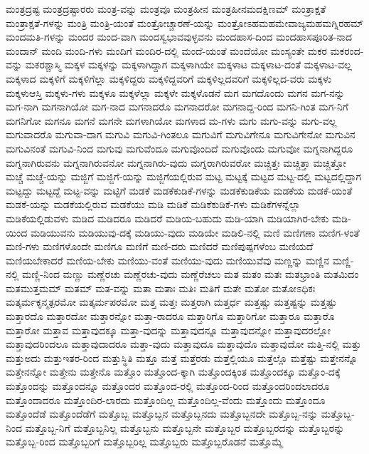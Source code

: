 {ಮಂತ್ರದ್ರಷ್ಟ
ಮಂತ್ರದ್ರಷ್ಟಾರರು
ಮಂತ್ರ-ವನ್ನು
ಮಂತ್ರವೂ
ಮಂತ್ರಹೀನ
ಮಂತ್ರಹೀನಮದಕ್ಷಿಣಮ್
ಮಂತ್ರಾಕ್ಷತೆ
ಮಂತ್ರಾಕ್ಷತೆ-ಗಳನ್ನು
ಮಂತ್ರಿ
ಮಂತ್ರಿ-ಯಂತೆ
ಮಂತ್ರೋಚ್ಚಾರಣೆ-ಯನ್ನು
ಮಂತ್ರೋಽಹಮಹಮೇವಾಜ್ಯಮಹಮಗ್ನಿರಹಮ್
ಮಂದಮತಿ-ಗಳನ್ನು
ಮಂದರ
ಮಂದ-ವಾಗಿ
ಮಂದಸ್ವಭಾವವುಳ್ಳವನು
ಮಂದಹಾಸ-ದಿಂದ
ಮಂದಹಾಸಪೂರಿತ-ನಾದ
ಮಂದಾನ್
ಮಂದಿ
ಮಂದಿ-ಗಳು
ಮಂದಿಗೆ
ಮಂದಿರ-ದಲ್ಲಿ
ಮಂದೆ-ಯಂತೆ
ಮಂದೆಯೋ
ಮಂಸ್ಯಂತೇ
ಮಕರ
ಮಕರಂದ-ವನ್ನು
ಮಕರಶ್ಚಾಸ್ಮಿ
ಮಕ್ಕಳ
ಮಕ್ಕಳನ್ನು
ಮಕ್ಕಳಾಗಿದ್ದಾಗ
ಮಕ್ಕಳಾಗಿಯೇ
ಮಕ್ಕಳಾಟ
ಮಕ್ಕಳಾಟ-ದಂತೆ
ಮಕ್ಕಳಾಟ-ವಲ್ಲ
ಮಕ್ಕಳಾದ
ಮಕ್ಕಳಿಗೆ
ಮಕ್ಕಳಿಗೆಲ್ಲಾ
ಮಕ್ಕಳಿದ್ದರು
ಮಕ್ಕಳಿದ್ದವರಿಗೆ
ಮಕ್ಕಳಿಲ್ಲದವರಿಗೆ
ಮಕ್ಕಳಿಲ್ಲದ-ವರು
ಮಕ್ಕಳು
ಮಕ್ಕಳುಆಸ್ತಿ
ಮಕ್ಕಳು-ಗಳು
ಮಕ್ಕಳೂ
ಮಕ್ಕಳೆಲ್ಲಾ
ಮಕ್ಕಳೇ
ಮಕ್ಕಳೊಡನೆ
ಮಗ
ಮಗದೊಂದು
ಮಗನ
ಮಗ-ನನ್ನು
ಮಗ-ನಾಗಿ
ಮಗನಾಗಿಯೋ
ಮಗ-ನಾದ
ಮಗನಾದರೊ
ಮಗನಾದರೋ
ಮಗನಾದ್ದ-ರಿಂದ
ಮಗನಿ-ಗಿಂತ
ಮಗ-ನಿಗೆ
ಮಗನಿಗೋ
ಮಗನೂ
ಮಗನೆ
ಮಗನೇ
ಮಗಳಾಗಿಯೋ
ಮಗಳಾದ
ಮ-ಗಳು
ಮಗು
ಮಗು-ವನ್ನು
ಮಗು-ವಲ್ಲ
ಮಗುವಾದರೊ
ಮಗುವಾ-ದಾಗ
ಮಗುವಿ
ಮಗುವಿ-ಗಿಂತಲೂ
ಮಗುವಿಗೆ
ಮಗುವಿಗೇನೂ
ಮಗುವಿಗೇನೋ
ಮಗುವಿನ
ಮಗುವಿನಂತೆ
ಮಗುವಿ-ನಿಂದ
ಮಗುವು
ಮಗುವೆಂದೂ
ಮಗುವೊಂದಿದೆ
ಮಗುವೊಂದು
ಮಗುವೋ
ಮಗ್ನನಾಗಿದ್ದರೂ
ಮಗ್ನನಾಗಿರುವನು
ಮಗ್ನನಾಗಿರುವನೋ
ಮಗ್ನನಾಗಿರು-ವುದು
ಮಗ್ನರಾಗಿರುವರೋ
ಮಚ್ಚಿತ್ತಃ
ಮಚ್ಚಿತ್ತಾ
ಮಚ್ಚಿತ್ತೋ
ಮಚ್ಚೆ
ಮಚ್ಚೆ-ಯನ್ನು
ಮಜ್ಜಿಗೆ
ಮಜ್ಜಿಗೆ-ಯನ್ನು
ಮಜ್ಜಿಗೆಯಲ್ಲಿರುವ
ಮಟ್ಟ
ಮಟ್ಟಕ್ಕೆ
ಮಟ್ಟದ
ಮಟ್ಟ-ದಲ್ಲಿ
ಮಟ್ಟದಲ್ಲಿದ್ದಾಗ
ಮಟ್ಟದ್ದು
ಮಟ್ಟದ್ದೆ
ಮಟ್ಟ-ವನ್ನು
ಮಟ್ಟಿಗೆ
ಮಡಕೆ
ಮಡಕೆಕುಡಿಕೆ-ಗಳನ್ನು
ಮಡಕೆಕುಡಿಕೆಯ
ಮಡಕೆಯ
ಮಡಕೆ-ಯಂತೆ
ಮಡಕೆ-ಯನ್ನು
ಮಡಕೆಯಲ್ಲಿರುವ
ಮಡಕೆಯು
ಮಡಿ
ಮಡಿಕೆ
ಮಡಿಕೆಕುಡಿಕೆ-ಗಳು
ಮಡಿಕೆಗಳನ್ನೆಲ್ಲಾ
ಮಡಿಕೆಯಲ್ಲಿಡುವಳು
ಮಡಿದ
ಮಡಿದರೂ
ಮಡಿದರೆ
ಮಡಿಯ-ಬಹುದು
ಮಡಿ-ಯಾಗಿ
ಮಡಿಯಾಗಿರ-ಬೇಕು
ಮಡಿ-ಯಿಂದ
ಮಡಿಯುವನು
ಮಡಿಯುವು-ದಕ್ಕೆ
ಮಡಿಯು-ವುದು
ಮಡಿಯೇ
ಮಡಿಲಿ-ನಲ್ಲಿ
ಮಣಿ
ಮಣಿಗಣಾ
ಮಣಿಗ-ಳಂತೆ
ಮಣಿ-ಗಳು
ಮಣಿಗಳೊಂದೇ
ಮಣಿಗೂ
ಮಣಿಗೆ
ಮಣಿ-ದರು
ಮಣಿದರೆ
ಮಣಿಪುಷ್ಪಗಳೆಂಬ
ಮಣಿಯದೆ
ಮಣಿಯಬೇಕಾದರೆ
ಮಣಿಯ-ಬೇಕು
ಮಣಿಯು-ವಂತೆ
ಮಣಿಯು-ವುದು
ಮಣಿಯುವೆವು
ಮಣ್ಣನ್ನು
ಮಣ್ಣಿನ
ಮಣ್ಣಿ-ನಲ್ಲಿ
ಮಣ್ಣಿ-ನಿಂದ
ಮಣ್ಣು
ಮಣ್ಣೆರಚು
ಮಣ್ಣೆರಚು-ವುದು
ಮಣ್ಣೆರೆಚಲು
ಮತ
ಮತಂ
ಮತಃ
ಮತಭ್ರಾಂತಿ
ಮತಮಿದಂ
ಮತಮುತ್ತಮಮ್
ಮತಮ್
ಮತ-ವನ್ನು
ಮತಾ
ಮತಾಃ
ಮತಿಃ
ಮತಿಗೆ
ಮತೇ
ಮತೋ
ಮತೋಽಧಿಕಃ
ಮತ್ಕರ್ಮಕೃನ್ಮತ್ಪರಮೋ
ಮತ್ಕರ್ಮಪರಮೋ
ಮತ್ತ
ಮತ್ತಃ
ಮತ್ತರಾಗಿ
ಮತ್ತರ್ಧ
ಮತ್ತಷ್ಚು
ಮತ್ತಷ್ಟನ್ನು
ಮತ್ತಷ್ಟು
ಮತ್ತಾರದೊ
ಮತ್ತಾರದೋ
ಮತ್ತಾರನ್ನೋ
ಮತ್ತಾ-ರಾದರೂ
ಮತ್ತಾರಿಗೊ
ಮತ್ತಾರಿಗೋ
ಮತ್ತಾರೂ
ಮತ್ತಾರೊ
ಮತ್ತಾರೋ
ಮತ್ತಾವ
ಮತ್ತಾವುದಕ್ಕೂ
ಮತ್ತಾ-ವುದನ್ನು
ಮತ್ತಾವುದನ್ನೂ
ಮತ್ತಾವುದನ್ನೋ
ಮತ್ತಾವುದರಲ್ಲೋ
ಮತ್ತಾವುದರಿಂದಲೂ
ಮತ್ತಾವುದಾದರೂ
ಮತ್ತಾ-ವುದು
ಮತ್ತಾವುದೂ
ಮತ್ತಾವುದೊ
ಮತ್ತಾವುದೋ
ಮತ್ತಿ-ನಲ್ಲಿ
ಮತ್ತು
ಮತ್ತುಅದು
ಮತ್ತುಇತರ-ರಿಂದ
ಮತ್ತುಸ್ಥಿತಿ
ಮತ್ತೂ
ಮತ್ತೆ
ಮತ್ತೆರಡು
ಮತ್ತೆಲ್ಲಿಯೂ
ಮತ್ತೆಲ್ಲೊ
ಮತ್ತೆಷ್ಟು
ಮತ್ತೇನನ್ನೊ
ಮತ್ತೇನನ್ನೋ
ಮತ್ತೇನು
ಮತ್ತೇನೊ
ಮತ್ತೊಂ
ಮತ್ತೊಂದ-ಕ್ಕಾಗಿ
ಮತ್ತೊಂದಕ್ಕಿಂತ
ಮತ್ತೊಂದಕ್ಕೂ
ಮತ್ತೊಂ-ದಕ್ಕೆ
ಮತ್ತೊಂದನ್ನು
ಮತ್ತೊಂದನ್ನೂ
ಮತ್ತೊಂದರ
ಮತ್ತೊಂದ-ರಲ್ಲಿ
ಮತ್ತೊಂದ-ರಿಂದ
ಮತ್ತೊಂದರಿಂದಲಾದರೂ
ಮತ್ತೊಂದಾದರೂ
ಮತ್ತೊಂದಿರ-ಲಾರದು
ಮತ್ತೊಂದಿಲ್ಲ
ಮತ್ತೊಂದಿಲ್ಲ-ವೆಂದು
ಮತ್ತೊಂದು
ಮತ್ತೊಂದೂ
ಮತ್ತೊಂದೆಡೆ
ಮತ್ತೊಂದೆಡೆಗೆ
ಮತ್ತೊಬ್ಬ
ಮತ್ತೊಬ್ಬನ
ಮತ್ತೊಬ್ಬನದು
ಮತ್ತೊಬ್ಬನದೇ
ಮತ್ತೊಬ್ಬ-ನನ್ನು
ಮತ್ತೊಬ್ಬ-ನಿಂದ
ಮತ್ತೊಬ್ಬ-ನಿಗೆ
ಮತ್ತೊಬ್ಬನಿಲ್ಲ
ಮತ್ತೊಬ್ಬನು
ಮತ್ತೊಬ್ಬನೇ
ಮತ್ತೊಬ್ಬರ
ಮತ್ತೊಬ್ಬರದನ್ನು
ಮತ್ತೊಬ್ಬರನ್ನು
ಮತ್ತೊಬ್ಬ-ರಿಂದ
ಮತ್ತೊಬ್ಬರಿಗೆ
ಮತ್ತೊಬ್ಬರಿಲ್ಲ
ಮತ್ತೊಬ್ಬರು
ಮತ್ತೊಬ್ಬರೊಡನೆ
ಮತ್ತೊಮ್ಮೆ
}
